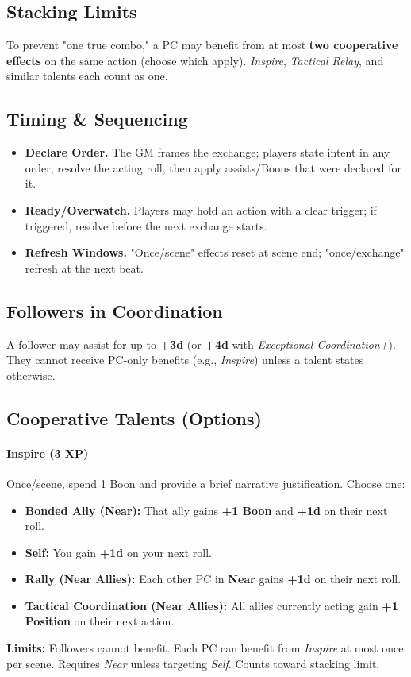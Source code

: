 \subsection{Stacking Limits}
\label{sec:stacking}
To prevent "one true combo," a PC may benefit from at most \textbf{two cooperative effects} on the same action (choose which apply). \emph{Inspire}, \emph{Tactical Relay}, and similar talents each count as one.

\subsection{Timing \& Sequencing}
\label{sec:timing}
\begin{itemize}
  \item \textbf{Declare Order.} The GM frames the exchange; players state intent in any order; resolve the acting roll, then apply assists/Boons that were declared for it.
  \item \textbf{Ready/Overwatch.} Players may hold an action with a clear trigger; if triggered, resolve before the next exchange starts.
  \item \textbf{Refresh Windows.} "Once/scene" effects reset at scene end; "once/exchange" refresh at the next beat.
\end{itemize}

\subsection{Followers in Coordination}
\label{sec:followers-coord}
A follower may assist for up to \textbf{+3d} (or \textbf{+4d} with \emph{Exceptional Coordination+}). They cannot receive PC‑only benefits (e.g., \emph{Inspire}) unless a talent states otherwise.

\subsection{Cooperative Talents (Options)}

\paragraph{Inspire (3 XP)}
Once/scene, spend 1 Boon and provide a brief narrative justification. Choose one:
\begin{itemize}
  \item \textbf{Bonded Ally (Near):} That ally gains \textbf{+1 Boon} and \textbf{+1d} on their next roll.
  \item \textbf{Self:} You gain \textbf{+1d} on your next roll.
  \item \textbf{Rally (Near Allies):} Each other PC in \textbf{Near} gains \textbf{+1d} on their next roll.
  \item \textbf{Tactical Coordination (Near Allies):} All allies currently acting gain \textbf{+1 Position} on their next action.
\end{itemize}
\textbf{Limits:} Followers cannot benefit. Each PC can benefit from \emph{Inspire} at most once per scene. Requires \emph{Near} unless targeting \emph{Self}. Counts toward stacking limit.

